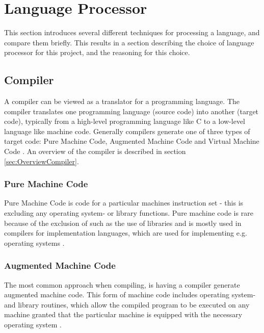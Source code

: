 \section{Language Processor}
This section introduces several different techniques for processing a language, and compare them briefly. This results in a section describing the choice of language processor for this project, and the reasoning for this choice.

\subsection{Compiler}
A compiler can be viewed as a translator for a programming language. The compiler translates one programming language (source code) into another (target code), typically from a high-level programming language like C to a low-level language like machine code. Generally compilers generate one of three types of target code: Pure Machine Code, Augmented Machine Code and Virtual Machine Code \citep{CraftingACompiler}. An overview of the compiler is described in section \ref{sec:OverviewCompiler}.

\subsubsection{Pure Machine Code} 
Pure Machine Code is code for a particular machines instruction set - this is excluding any operating system- or library functions. Pure machine code is rare because of the exclusion of such as the use of libraries and is mostly used in compilers for implementation languages, which are used for implementing e.g. operating systems \citep{CraftingACompiler}.
 
\subsubsection{Augmented Machine Code}
The most common approach when compiling, is having a compiler generate augmented machine code. This form of machine code includes operating system- and library routines, which allow the compiled program to be executed on any machine granted that the particular machine is equipped with the necessary operating system \citep{CraftingACompiler}.

